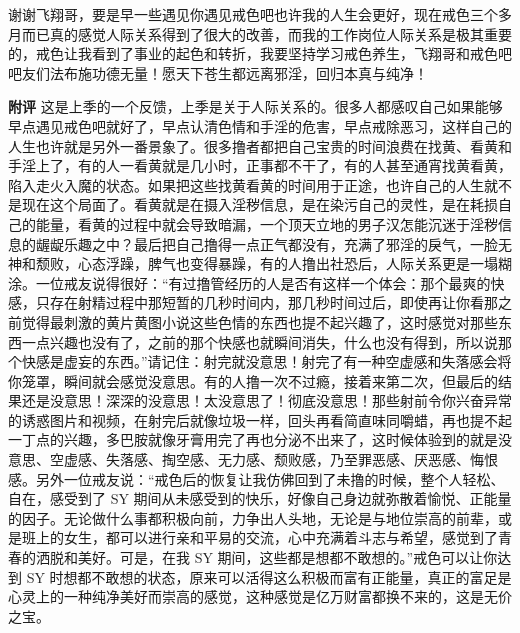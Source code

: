 \begin{case}
    谢谢飞翔哥，要是早一些遇见你遇见戒色吧也许我的人生会更好，现在戒色三个多月而已真的感觉人际关系得到了很大的改善，而我的工作岗位人际关系是极其重要的，戒色让我看到了事业的起色和转折，我要坚持学习戒色养生，飞翔哥和戒色吧吧友们法布施功德无量！愿天下苍生都远离邪淫，回归本真与纯净！

    \textbf{附评} 这是上季的一个反馈，上季是关于人际关系的。很多人都感叹自己如果能够早点遇见戒色吧就好了，早点认清色情和手淫的危害，早点戒除恶习，这样自己的人生也许就是另外一番景象了。很多撸者都把自己宝贵的时间浪费在找黄、看黄和手淫上了，有的人一看黄就是几小时，正事都不干了，有的人甚至通宵找黄看黄，陷入走火入魔的状态。如果把这些找黄看黄的时间用于正途，也许自己的人生就不是现在这个局面了。看黄就是在摄入淫秽信息，是在染污自己的灵性，是在耗损自己的能量，看黄的过程中就会导致暗漏，一个顶天立地的男子汉怎能沉迷于淫秽信息的龌龊乐趣之中？最后把自己撸得一点正气都没有，充满了邪淫的戾气，一脸无神和颓败，心态浮躁，脾气也变得暴躁，有的人撸出社恐后，人际关系更是一塌糊涂。一位戒友说得很好：“有过撸管经历的人是否有这样一个体会：那个最爽的快感，只存在射精过程中那短暂的几秒时间内，那几秒时间过后，即使再让你看那之前觉得最刺激的黄片黄图小说这些色情的东西也提不起兴趣了，这时感觉对那些东西一点兴趣也没有了，之前的那个快感也就瞬间消失，什么也没有得到，所以说那个快感是虚妄的东西。”请记住：射完就没意思！射完了有一种空虚感和失落感会将你笼罩，瞬间就会感觉没意思。有的人撸一次不过瘾，接着来第二次，但最后的结果还是没意思！深深的没意思！太没意思了！彻底没意思！那些射前令你兴奋异常的诱惑图片和视频，在射完后就像垃圾一样，回头再看简直味同嚼蜡，再也提不起一丁点的兴趣，多巴胺就像牙膏用完了再也分泌不出来了，这时候体验到的就是没意思、空虚感、失落感、掏空感、无力感、颓败感，乃至罪恶感、厌恶感、悔恨感。另外一位戒友说：“戒色后的恢复让我仿佛回到了未撸的时候，整个人轻松、自在，感受到了 SY 期间从未感受到的快乐，好像自己身边就弥散着愉悦、正能量的因子。无论做什么事都积极向前，力争出人头地，无论是与地位崇高的前辈，或是班上的女生，都可以进行亲和平易的交流，心中充满着斗志与希望，感觉到了青春的洒脱和美好。可是，在我 SY 期间，这些都是想都不敢想的。”戒色可以让你达到 SY 时想都不敢想的状态，原来可以活得这么积极而富有正能量，真正的富足是心灵上的一种纯净美好而崇高的感觉，这种感觉是亿万财富都换不来的，这是无价之宝。
\end{case}

